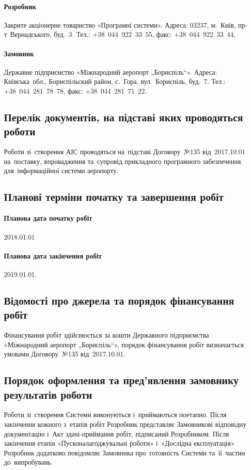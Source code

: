 \documentclass[
	a4paper,
	oneside,
	BCOR = 10mm,
	DIV = 12,
	12pt,
	headings = normal,
]{scrartcl}
\newcommand{\allcaps}[1]{{\addfontfeatures{LetterSpace = 8, Kerning = Off}#1}}
\begin{document}
			\paragraph{Розробник}
				Закрите акціонерне товариство «Програмні системи». Адреса: 03237, м.~Київ, пр-т~Вернадського, буд.~3. Тел.: \mbox{+38 044 922 33 55}, факс: \mbox{+38 044 922 33 44}. 

			\paragraph{Замовник}
				Державне підприємство «Міжнародний аеропорт „Бориспіль“». Адреса: Київська~обл., Бориспільский район, с.~Гора, вул.~Бориспіль, буд.~7. Тел.: \mbox{+38 044 281 78 78}, факс: \mbox{+38 044 281 71 22}. 

		\subsection{Перелік документів, на підставі яких проводяться роботи}
			Роботи зі~створення \allcaps{АІС} проводяться на~підставі Договору~№135 від~2017.10.01 на~поставку, впровадження та~супровід прикладного програмного забезпечення для~інформаційної системи аеропорту.

		\subsection{Планові терміни початку та завершення робіт}
			\paragraph{Планова дата початку робіт}
				2018.01.01
			\paragraph{Планова дата закінчення робіт}
				2019.01.01.

		\subsection{Відомості про джерела та порядок фінансування робіт}
			Фінансування робіт здійснюється за кошти Державного підприємства «Міжнародний аеропорт „Бориспіль“», порядок фінансування робіт визначається умовами Договору~№135 від~2017.10.01.

		\subsection{Порядок оформлення та пред'явлення замовнику результатів роботи}
			Роботи зі~створення Системи виконуються і~приймаються поетапно. Після закінчення кожного з~етапів робіт Розробник представляє Замовникові відповідну документацію і~Акт здачі-приймання робіт, підписаний Розробником. Після закінчення етапів «Пусконалагоджувальні роботи» і~«Дослідна експлуатація» Розробник додатково повідомляє Замовника про~готовність Системи та~її~частин до~випробувань.
\end{document}
